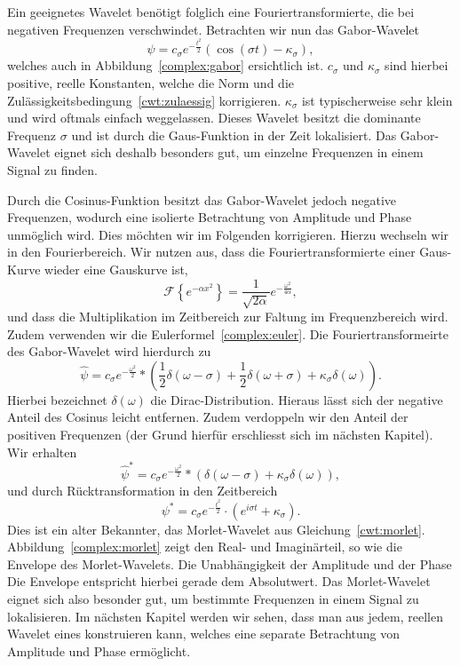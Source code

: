 \begin{refsection}
Ein geeignetes Wavelet benötigt folglich eine Fouriertransformierte, die bei negativen Frequenzen verschwindet.
Betrachten wir nun das Gabor-Wavelet
\[
	\psi = c_\sigma e^{-\frac{t^2}{2}}\left(\cos\left(\sigma t\right) - \kappa_\sigma\right),
\]
welches auch in Abbildung~\ref{complex:gabor} ersichtlich ist.
$c_\sigma$ und $\kappa_\sigma$ sind hierbei positive, reelle Konstanten, welche die Norm und die Zulässigkeitsbedingung~\eqref{cwt:zulaessig} korrigieren.
$\kappa_\sigma$ ist typischerweise sehr klein und wird oftmals einfach weggelassen.
Dieses Wavelet besitzt die dominante Frequenz $\sigma$ und ist durch die Gaus-Funktion in der Zeit lokalisiert.
Das Gabor-Wavelet eignet sich deshalb besonders gut, um einzelne Frequenzen in einem Signal zu finden.

Durch die Cosinus-Funktion besitzt das Gabor-Wavelet jedoch negative Frequenzen, wodurch eine isolierte Betrachtung von Amplitude und Phase unmöglich wird.
Dies möchten wir im Folgenden korrigieren.
Hierzu wechseln wir in den Fourierbereich.
Wir nutzen aus, dass die Fouriertransformierte einer Gaus-Kurve wieder eine Gauskurve ist,
\[
	\mathcal{F}\left\lbrace e^{-\alpha x^2} \right\rbrace 
	= \frac{1}{\sqrt{2\alpha}}e^{- \frac{\omega^2}{4\alpha}},
\]
und dass die Multiplikation im Zeitbereich zur Faltung im Frequenzbereich wird.
Zudem verwenden wir die Eulerformel~\eqref{complex:euler}.
Die Fouriertransformeirte des Gabor-Wavelet wird hierdurch zu
\[
 \hat{\psi} = 
 c_\sigma e^{- \frac{\omega^2}{2}} * \left(
  \frac{1}{2}\delta(\omega - \sigma) +
  \frac{1}{2}\delta(\omega + \sigma) + 
  \kappa_\sigma\delta(\omega)
  \right).
\]
Hierbei bezeichnet $\delta(\omega)$ die Dirac-Distribution.
Hieraus lässt sich der negative Anteil des Cosinus leicht entfernen.
Zudem verdoppeln wir den Anteil der positiven Frequenzen (der Grund hierfür erschliesst sich im nächsten Kapitel).
Wir erhalten
\[
	\hat{\psi}^\ast = 
	c_\sigma e^{- \frac{\omega^2}{2}} * \left(
	\delta(\omega - \sigma) +
	\kappa_\sigma\delta(\omega)
	\right),
\]
und durch Rücktransformation in den Zeitbereich
\[
	\psi^\ast = 
	c_\sigma e^{- \frac{t^2}{2}} \cdot \left(
	e^{i\sigma t} +
	\kappa_\sigma
	\right).
\]
Dies ist ein alter Bekannter, das Morlet-Wavelet aus Gleichung~\eqref{cwt:morlet}.
Abbildung~\ref{complex:morlet} zeigt den Real- und Imaginärteil, so wie die Envelope des Morlet-Wavelets.
Die Unabhängigkeit der Amplitude und der Phase 
Die Envelope entspricht hierbei gerade dem Absolutwert.
Das Morlet-Wavelet eignet sich also besonder gut, um bestimmte Frequenzen in einem Signal zu lokalisieren.
Im nächsten Kapitel werden wir sehen, dass man aus jedem, reellen Wavelet eines konstruieren kann, welches eine separate Betrachtung von Amplitude und Phase ermöglicht.


\end{refsection}
